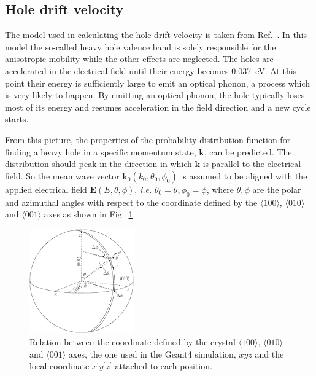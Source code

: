 \subsection{Hole drift velocity}
\label{sec:pss:hole}
The model used in calculating the hole drift velocity is taken from Ref.~\cite{bart}. In this model the so-called heavy hole valence band is solely responsible for the anisotropic mobility while the other effects are neglected. The holes are accelerated in the electrical field until their energy becomes 0.037~eV. At this point their energy is sufficiently large to emit an optical phonon, a process which is very likely to happen. By emitting an optical phonon, the hole typically loses most of its energy and resumes acceleration in the field direction and a new cycle starts. 

From this picture, the properties of the probability distribution function for finding a heavy hole in a specific momentum state, $\mathbf{k}$, can be predicted. The distribution should peak in the direction in which $\mathbf{k}$ is parallel to the electrical field. So the mean wave vector $\mathbf{k}_{0}(k_{0}, \theta_{0}, \phi_{0})$ is assumed to be aligned with the applied electrical field $\mathbf{E}(E, \theta, \phi)$, \textit{i.e.} $\theta_{0} = \theta, \phi_{0} = \phi$, where $\theta, \phi$ are the polar and azimuthal angles with respect to the coordinate defined by the $\langle100\rangle$, $\langle010\rangle$ and $\langle001\rangle$ axes as shown in Fig.~\ref{fig:pss:vsphere}.
\begin{figure}
\centering
\includegraphics[width=0.4\textwidth]{vsphere}  
\caption{Relation between the coordinate defined by the crystal
$\langle100\rangle$, $\langle010\rangle$ and $\langle001\rangle$ axes,
the one used in the Geant4 simulation, $xyz$ and the local coordinate
$x^{\prime}y^{\prime}z^{\prime}$ attached to each position.}
\label{fig:pss:vsphere}
\end{figure}

